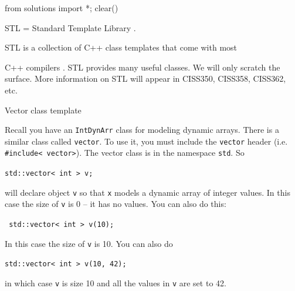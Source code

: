 \begin{python0}
from solutions import *; clear()
\end{python0}

STL = Standard Template Library .

STL is a collection of C++ class templates that come with most

C++ compilers . STL provides many useful classes. We will only scratch
the surface. More information on STL will appear in CISS350, CISS358,
CISS362, etc.

Vector class template

Recall you have an \texttt{IntDynArr} class for modeling dynamic arrays.
There is a similar class called \texttt{vector}. To use it, you must include the \texttt{vector} header (i.e. \verb!#include< vector>!). The vector class is in the namespace \texttt{std}. So
\begin{center}
\verb!std::vector< int > v;!
\end{center}
will declare object \texttt{v} so that \texttt{x} models a dynamic array of
integer values. In this case the size of \texttt{v} is 0 -- it has no
values. You can also do this:
\begin{center}
\texttt{ std::vector< int > v(10);}
\end{center}
In this case the size of \texttt{v} is 10. You can also do
\begin{center}
\texttt{std::vector< int > v(10, 42);}
\end{center}
in which case \texttt{v} is size 10 and all the values in \texttt{v} are set
to 42.



